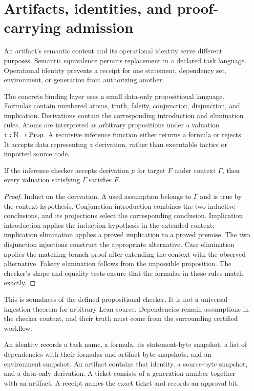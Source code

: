 \section{Artifacts, identities, and proof-carrying admission}
\label{sec:artifact-identities}

An artifact's semantic content and its operational identity serve different purposes. Semantic equivalence permits replacement in a declared task language. Operational identity prevents a receipt for one statement, dependency set, environment, or generation from authorizing another.

The concrete binding layer uses a small data-only propositional language. Formulas contain numbered atoms, truth, falsity, conjunction, disjunction, and implication. Derivations contain the corresponding introduction and elimination rules. Atoms are interpreted as arbitrary propositions under a valuation $v:\mathbb N\to\operatorname{Prop}$. A recursive inference function either returns a formula or rejects. It accepts data representing a derivation, rather than executable tactics or imported source code.

\begin{theorem}
If the inference checker accepts derivation $p$ for target $F$ under context $\Gamma$, then every valuation satisfying $\Gamma$ satisfies $F$.
\end{theorem}
\begin{proof}
Induct on the derivation. A used assumption belongs to $\Gamma$ and is true by the context hypothesis. Conjunction introduction combines the two inductive conclusions, and its projections select the corresponding conclusion. Implication introduction applies the induction hypothesis in the extended context; implication elimination applies a proved implication to a proved premise. The two disjunction injections construct the appropriate alternative. Case elimination applies the matching branch proof after extending the context with the observed alternative. Falsity elimination follows from the impossible proposition. The checker's shape and equality tests ensure that the formulas in these rules match exactly.
\end{proof}

This is soundness of the defined propositional checker. It is not a universal ingestion theorem for arbitrary Lean source. Dependencies remain assumptions in the checker context, and their truth must come from the surrounding certified workflow.

\begin{definition}
An identity records a task name, a formula, its statement-byte snapshot, a list of dependencies with their formulas and artifact-byte snapshots, and an environment snapshot. An artifact contains that identity, a source-byte snapshot, and a data-only derivation. A ticket consists of a generation number together with an artifact. A receipt names the exact ticket and records an approval bit.
\end{definition}

